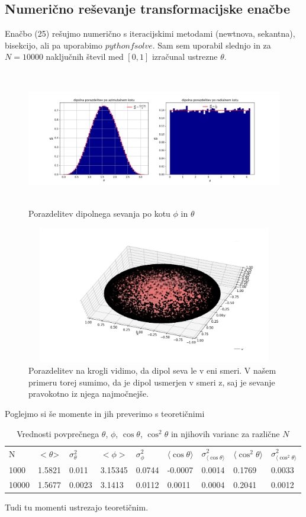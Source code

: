 \documentclass[11pt, a4paper]{article}
\begin{document}
\subsection{Numerično reševanje transformacijske enačbe}
Enačbo (25) rešujmo numerično s iteracijskimi metodami (newtnova, sekantna), bisekcijo, ali pa uporabimo $python fsolve$. Sam sem uporabil slednjo in za $N= 10000$ naključnih števil med $[0,1]$ izračunal ustrezne $\theta$.
\begin{figure}[H]
\hspace*{-2.5cm}  
  \includegraphics[width=22cm,height=6cm]{druga_dipolno1.png}
  \caption{Porazdelitev dipolnega sevanja po kotu $\phi$ in $\theta$}
\end{figure}

\begin{figure}[H]
\hspace*{-2.5cm}  
\centering
  \includegraphics[width=13cm,height=6cm]{druga_dipolno.png}
  \caption{Porazdelitev na krogli vidimo, da dipol seva le v eni smeri. V našem primeru torej sumimo, da je dipol usmerjen v smeri z, saj je sevanje pravokotno iz njega najmočnejše.} 
\end{figure}
Poglejmo si še momente in jih preverimo s teoretičnimi 
\begin{table}[H]
\centering
\caption{Vrednosti povprečnega $\theta$, $\phi$, $\cos{\theta}$, $\cos^2{\theta}$ in njihovih varianc za različne $N$}
\label{my-label}
\begin{tabular}{lllllllll}
N & $<\theta$> & $\sigma^2_{\theta}$ & $<\phi>$ & $\sigma^2_{\phi}$ & $\langle\cos{\theta}\rangle$ & $\sigma^2_{\langle\cos{\theta}\rangle}$ & $\langle\cos^2{\theta}\rangle$ & $\sigma^2_{\langle\cos^2{\theta}\rangle}$ \\

1000 & 1.5821& 0.011& 3.15345 & 0.0744 & -0.0007& 0.0014 & 0.1769& 0.0033 \\
10000 & 1.5677 & 0.0023 & 3.1413 & 0.0112 & 0.0011 & 0.0004 & 0.2041 & 0.0012
\end{tabular}
\end{table}
Tudi tu momenti ustrezajo teoretičnim.
\end{document}
